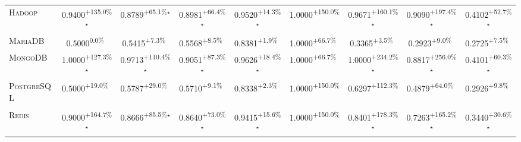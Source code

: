 \begin{table}[htbp]
\begin{tabular}{l|cccc|cccc}
\textsc{Hadoop} & \cellcolor{green!30}0.9400\textsuperscript{+135.0\%}$^\star$ & \cellcolor{green!30}0.8789\textsuperscript{+65.1\%}$^\star$ & \cellcolor{green!30}0.8981\textsuperscript{+66.4\%}$^\star$ & \cellcolor{green!30}0.9520\textsuperscript{+14.3\%}$^\star$ & \cellcolor{green!30}1.0000\textsuperscript{+150.0\%}$^{\,\,\,}$ & \cellcolor{green!30}0.9671\textsuperscript{+160.1\%}$^\star$ & \cellcolor{green!30}0.9090\textsuperscript{+197.4\%}$^\star$ & \cellcolor{green!30}0.4102\textsuperscript{+52.7\%}$^\star$ \\
\textsc{MariaDB} & \cellcolor{red!30}0.5000\textsuperscript{0.0\%}$^{\,\,\,}$ & \cellcolor{green!30}0.5415\textsuperscript{+7.3\%}$^{\,\,\,}$ & \cellcolor{green!30}0.5568\textsuperscript{+8.5\%}$^{\,\,\,}$ & \cellcolor{green!30}0.8381\textsuperscript{+1.9\%}$^{\,\,\,}$ & \cellcolor{green!30}1.0000\textsuperscript{+66.7\%}$^{\,\,\,}$ & \cellcolor{green!30}0.3365\textsuperscript{+3.5\%}$^{\,\,\,}$ & \cellcolor{green!30}0.2923\textsuperscript{+9.0\%}$^{\,\,\,}$ & \cellcolor{green!30}0.2725\textsuperscript{+7.5\%}$^{\,\,\,}$ \\
\textsc{MongoDB} & \cellcolor{green!30}1.0000\textsuperscript{+127.3\%}$^\star$ & \cellcolor{green!30}0.9713\textsuperscript{+110.4\%}$^\star$ & \cellcolor{green!30}0.9051\textsuperscript{+87.3\%}$^\star$ & \cellcolor{green!30}0.9626\textsuperscript{+18.4\%}$^\star$ & \cellcolor{green!30}1.0000\textsuperscript{+66.7\%}$^{\,\,\,}$ & \cellcolor{green!30}1.0000\textsuperscript{+234.2\%}$^\star$ & \cellcolor{green!30}0.8817\textsuperscript{+256.0\%}$^\star$ & \cellcolor{green!30}0.4101\textsuperscript{+60.3\%}$^\star$ \\
\textsc{PostgreSQL} & \cellcolor{green!30}0.5000\textsuperscript{+19.0\%}$^{\,\,\,}$ & \cellcolor{green!30}0.5787\textsuperscript{+29.0\%}$^{\,\,\,}$ & \cellcolor{green!30}0.5710\textsuperscript{+9.1\%}$^{\,\,\,}$ & \cellcolor{green!30}0.8338\textsuperscript{+2.3\%}$^{\,\,\,}$ & \cellcolor{green!30}1.0000\textsuperscript{+150.0\%}$^{\,\,\,}$ & \cellcolor{green!30}0.6297\textsuperscript{+112.3\%}$^{\,\,\,}$ & \cellcolor{green!30}0.4879\textsuperscript{+64.0\%}$^{\,\,\,}$ & \cellcolor{green!30}0.2926\textsuperscript{+9.8\%}$^{\,\,\,}$ \\
\textsc{Redis} & \cellcolor{green!30}0.9000\textsuperscript{+164.7\%}$^\star$ & \cellcolor{green!30}0.8666\textsuperscript{+85.5\%}$^\star$ & \cellcolor{green!30}0.8640\textsuperscript{+73.0\%}$^\star$ & \cellcolor{green!30}0.9415\textsuperscript{+15.6\%}$^\star$ & \cellcolor{green!30}1.0000\textsuperscript{+150.0\%}$^{\,\,\,}$ & \cellcolor{green!30}0.8401\textsuperscript{+178.3\%}$^\star$ & \cellcolor{green!30}0.7263\textsuperscript{+165.2\%}$^\star$ & \cellcolor{green!30}0.3440\textsuperscript{+30.6\%}$^\star$ \\

\end{tabular}
\end{table}
